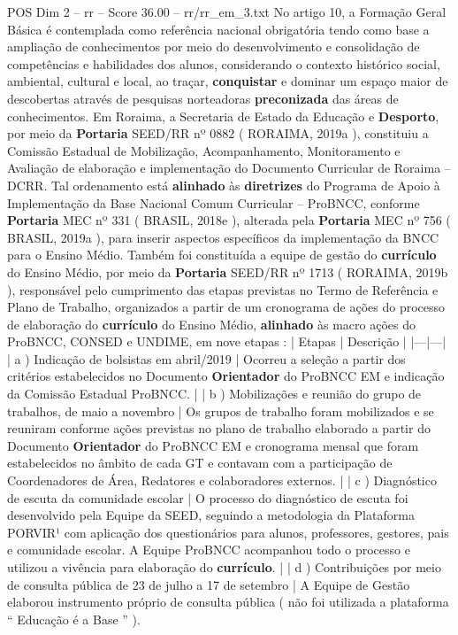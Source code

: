 \begin{textsample}{POS Dim 2 – rr – Score 36.00 – rr/rr\_em\_3.txt}
No artigo 10, a Formação Geral Básica é contemplada como referência nacional obrigatória tendo como base a ampliação de conhecimentos por meio do desenvolvimento e consolidação de competências e habilidades dos alunos, considerando o contexto histórico social, ambiental, cultural e local, ao traçar, \textbf{conquistar} e dominar um espaço maior de descobertas através de pesquisas norteadoras \textbf{preconizada} das áreas de conhecimentos.
Em Roraima, a Secretaria de Estado da Educação e \textbf{Desporto}, por meio da \textbf{Portaria} SEED/RR nº 0882 ( RORAIMA, 2019a ), constituiu a Comissão Estadual de Mobilização, Acompanhamento, Monitoramento e Avaliação de elaboração e implementação do Documento Curricular de Roraima – DCRR.
Tal ordenamento está \textbf{alinhado} às \textbf{diretrizes} do Programa de Apoio à Implementação da Base Nacional Comum Curricular – ProBNCC, conforme \textbf{Portaria} MEC nº 331 ( BRASIL, 2018e ), alterada pela \textbf{Portaria} MEC nº 756 ( BRASIL, 2019a ), para inserir aspectos específicos da implementação da BNCC para o Ensino Médio.
Também foi constituída a equipe de gestão do \textbf{currículo} do Ensino Médio, por meio da \textbf{Portaria} SEED/RR nº 1713 ( RORAIMA, 2019b ), responsável pelo cumprimento das etapas previstas no Termo de Referência e Plano de Trabalho, organizados a partir de um cronograma de ações do processo de elaboração do \textbf{currículo} do Ensino Médio, \textbf{alinhado} às macro ações do ProBNCC, CONSED e UNDIME, em nove etapas : | Etapas | Descrição | |---|---| | a ) Indicação de bolsistas em abril/2019 | Ocorreu a seleção a partir dos critérios estabelecidos no Documento \textbf{Orientador} do ProBNCC EM e indicação da Comissão Estadual ProBNCC. | | b ) Mobilizações e reunião do grupo de trabalhos, de maio a novembro | Os grupos de trabalho foram mobilizados e se reuniram conforme ações previstas no plano de trabalho elaborado a partir do Documento \textbf{Orientador} do ProBNCC EM e cronograma mensal que foram estabelecidos no âmbito de cada GT e contavam com a participação de Coordenadores de Área, Redatores e colaboradores externos. | | c ) Diagnóstico de escuta da comunidade escolar | O processo do diagnóstico de escuta foi desenvolvido pela Equipe da SEED, seguindo a metodologia da Plataforma PORVIR¹ com aplicação dos questionários para alunos, professores, gestores, pais e comunidade escolar.
A Equipe ProBNCC acompanhou todo o processo e utilizou a vivência para elaboração do \textbf{currículo}. | | d ) Contribuições por meio de consulta pública de 23 de julho a 17 de setembro | A Equipe de Gestão elaborou instrumento próprio de consulta pública ( não foi utilizada a plataforma “ Educação é a Base ” ).

\end{textsample}
